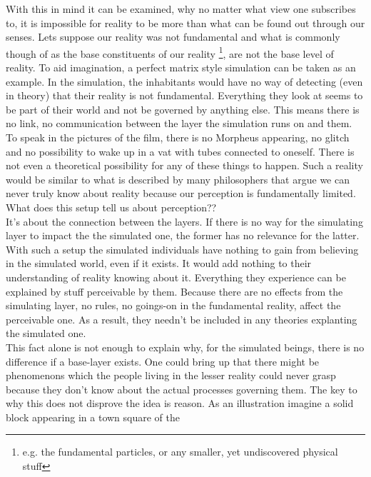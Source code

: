 \documentclass[fleqn,14pt]{article}
\begin{document}
With this in mind it can be examined, why no matter what view one subscribes to, it is impossible for reality
to be more than what can be found out through our senses.
Lets suppose our reality was not fundamental
and what is commonly though of as the base constituents of our reality \footnote{e.g. the fundamental
particles, or any smaller, yet undiscovered physical stuff}, are not the base level of reality.
To aid imagination, a perfect matrix style simulation can be taken as an example. In the simulation,
the inhabitants would have no way of detecting (even in theory) that their reality is not fundamental.
Everything they look at seems to be part of their world and not be governed by anything else. This means
there is no link, no communication between the layer
the simulation runs on and them. To speak in the pictures of the film, there is no Morpheus appearing,
no glitch and no possibility to wake up in a vat with tubes connected to oneself. There is not even a 
theoretical possibility for any of these things to happen. Such a reality would be similar to what is
described by many philosophers that argue we can never truly know about reality because our perception
is fundamentally limited.\\
What does this setup tell us about perception??\\
It's about the connection between the layers. If there is no way for the simulating layer to impact the
the simulated one, the former has no relevance for the latter. With such a setup the simulated
individuals have nothing to gain from believing in the simulated world, even if it exists. It would
add nothing to their understanding of reality knowing about it. Everything they experience can be explained
by stuff perceivable by them. Because there are no effects from the simulating layer, no rules,
no goings-on in the fundamental reality, affect the perceivable one.
As a result, they needn't be included in any theories explanting the simulated one. \\
This fact alone is not enough to explain why, for the simulated beings, there is no difference if a base-layer
exists.
One could bring up that there might be phenomenons which the people living in the lesser reality could never
grasp because they don't know about the actual processes governing them. The key to why this does not disprove
the idea is reason. As an illustration imagine a solid block appearing in a town square of the
\end{document}
